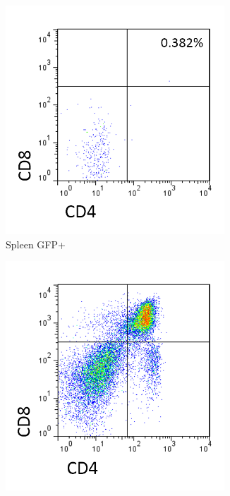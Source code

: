 \begin{figure}
	\begin{subfigure}{0.3\textwidth}
	\centering
	\includegraphics[width=0.9\textwidth]{Figures/SplnallposGFPpos.png}
	\caption{Spleen GFP+}
	\label{subfig:spleenRAGCD19DP}
	\end{subfigure}
	\hfill
	\begin{subfigure}{0.3\textwidth}
	\centering
	\includegraphics[width=0.9\textwidth]{Figures/Tcellgate.png}

\end{subfigure}
\end{figure}

